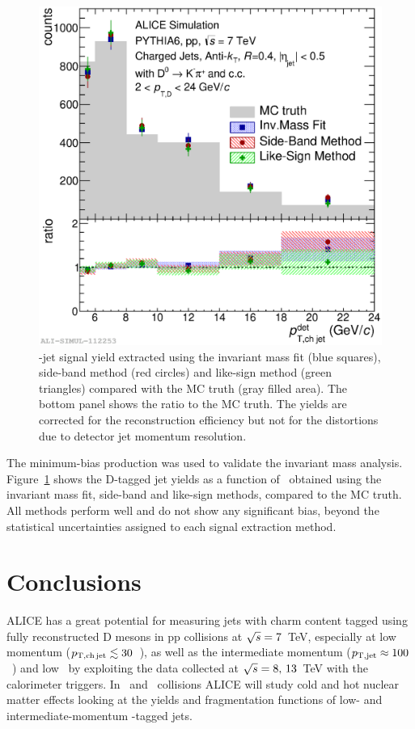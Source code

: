 \documentclass[a4paper]{jpconf}
\begin{document}
\begin{figure}[tb]
\includegraphics[width=.50\textwidth]{img/HQ16_Simulation_MethodComparison}\hspace{1pc}%
\begin{minipage}[b]{.50\textwidth}\caption{\label{fig:HQ16_Simulation_MethodComparison}\Dzero-jet signal yield extracted using the invariant mass fit (blue squares), side-band method (red circles) and like-sign method (green triangles)
compared with the MC truth (gray filled area). The bottom panel shows the ratio to the MC truth. The yields are corrected for the reconstruction efficiency but not for the distortions due to detector jet momentum resolution.}
\end{minipage}
\end{figure}

The minimum-bias production was used to validate the invariant mass analysis. 
Figure~\ref{fig:HQ16_Simulation_MethodComparison} shows the D-tagged jet yields as a function of \ptchjetdet\ obtained using the invariant mass fit, 
side-band and like-sign methods, compared to the MC truth. All methods perform well and do not show any significant bias, beyond the statistical uncertainties assigned to each signal extraction method.

\section{Conclusions}
ALICE has a great potential for measuring jets with charm content tagged using fully reconstructed D mesons in pp collisions at $\sqrt{s}=7$~TeV, especially at low momentum ($p_{\mathrm{T,ch\, jet}} \lesssim 30$~\GeVc),
as well as the intermediate momentum ($p_{\mathrm{T,jet}}\approx100$~\GeVc) and
low \ptd\ by exploiting the data collected at $\sqrt{s}=8,\,13$~TeV with the calorimeter triggers.
In \PbPb\ and \pPb\ collisions ALICE will study cold and hot nuclear matter effects
looking at the yields and fragmentation functions of low- and intermediate-momentum \Dzero-tagged jets.
\end{document}
